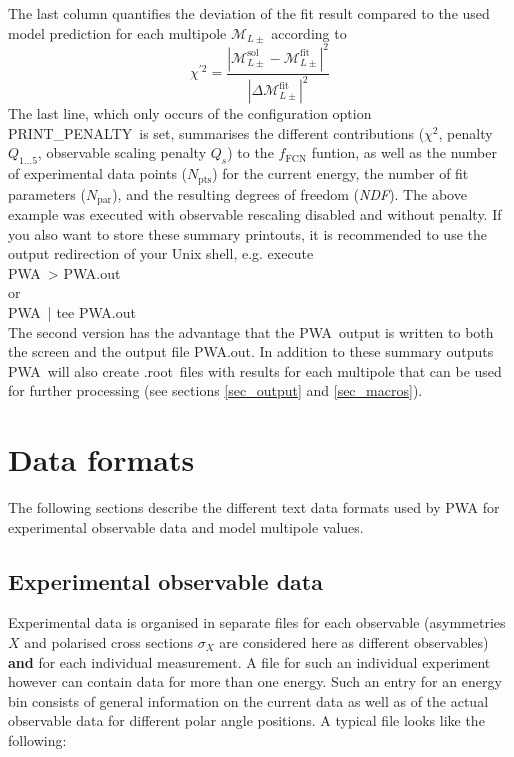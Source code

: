 \documentclass[a4paper,10pt]{article}
\def\PWA{\ttfamily PWA\rmfamily\ }
\def\tt{\ttfamily}
\def\rm{\rmfamily}
\begin{document}
The last column quantifies the deviation of the fit result compared to the used model prediction 
for each multipole $\mathcal{M}_{L\pm}$ according to
\begin{displaymath}
 \chi^{\prime2} = \frac{|\mathcal{M}_{L\pm}^\mathrm{sol} - \mathcal{M}_{L\pm}^\mathrm{fit}|^2}{|\Delta\mathcal{M}_{L\pm}^\mathrm{fit}|^2}
\end{displaymath}
The last line, which only occurs of the configuration option \tt PRINT\_PENALTY\rm\ is set, summarises
the different contributions ($\chi^2$, penalty $Q_{1...5}$, observable scaling penalty $Q_s$)
to the $f_\mathrm{FCN}$ funtion, as well as the number of experimental data points ($N_\mathrm{pts}$) for the current energy,
the number of fit parameters ($N_\mathrm{par}$), and the resulting degrees of freedom (\textit{NDF}).
The above example was executed with observable rescaling disabled and without penalty.
If you also want to store these summary printouts, it is recommended to use the output redirection of your Unix shell, e.g. 
execute\\
\PWA \tt [\textit{PWA.cfg}] > PWA.out \rm \\
or\\
\PWA \tt [\textit{PWA.cfg}]  | tee PWA.out \rm \\
The second version has the advantage that the \PWA output is written to both the screen and the output file \tt PWA.out\rm.
In addition to these summary outputs \PWA will also create \tt.root\rm\ files with results for each multipole that can be used
for further processing (see sections \ref{sec_output} and \ref{sec_macros}).

\section{Data formats}

The following sections describe the different text data formats used by PWA for experimental observable data and model multipole values. 

\subsection{Experimental observable data}

Experimental data is organised in separate files for each observable (asymmetries $X$ and polarised cross sections $\sigma_X$
are considered here as different observables) \textbf{and} for each individual measurement. A file for such an individual experiment
however can contain data for more than one energy.
Such an entry for an energy bin consists of general information on the current data as well as of the actual observable data
for different polar angle positions. A typical file looks like the following:\\
\end{document}
